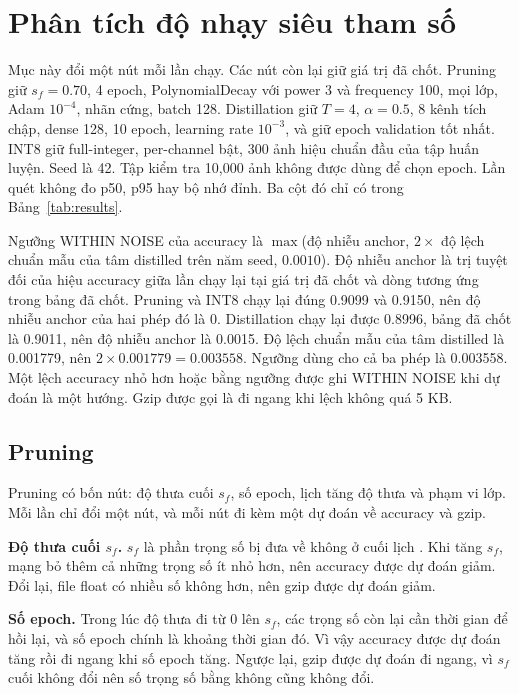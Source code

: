 \documentclass[13pt,a4paper]{article}
\begin{document}
\section{Phân tích độ nhạy siêu tham số}
\label{sec:sweep}

Mục này đổi một nút mỗi lần chạy.
Các nút còn lại giữ giá trị đã chốt.
Pruning giữ \(s_f=0.70\), 4 epoch, PolynomialDecay với power 3 và frequency 100, mọi lớp, Adam \(10^{-4}\), nhãn cứng, batch 128.
Distillation giữ \(T=4\), \(\alpha=0.5\), 8 kênh tích chập, dense 128, 10 epoch, learning rate \(10^{-3}\), và giữ epoch validation tốt nhất.
INT8 giữ full-integer, per-channel bật, 300 ảnh hiệu chuẩn đầu của tập huấn luyện.
Seed là 42.
Tập kiểm tra 10{,}000 ảnh không được dùng để chọn epoch.
Lần quét không đo p50, p95 hay bộ nhớ đỉnh.
Ba cột đó chỉ có trong Bảng~\ref{tab:results}.

Ngưỡng WITHIN NOISE của accuracy là \(\max\)(độ nhiễu anchor, \(2\times\) độ lệch chuẩn mẫu của tâm distilled trên năm seed, \(0.0010\)).
Độ nhiễu anchor là trị tuyệt đối của hiệu accuracy giữa lần chạy lại tại giá trị đã chốt và dòng tương ứng trong bảng đã chốt.
Pruning và INT8 chạy lại đúng 0.9099 và 0.9150, nên độ nhiễu anchor của hai phép đó là 0.
Distillation chạy lại được 0.8996, bảng đã chốt là 0.9011, nên độ nhiễu anchor là 0.0015.
Độ lệch chuẩn mẫu của tâm distilled là 0.001779, nên \(2\times 0.001779 = 0.003558\).
Ngưỡng dùng cho cả ba phép là 0.003558.
Một lệch accuracy nhỏ hơn hoặc bằng ngưỡng được ghi WITHIN NOISE khi dự đoán là một hướng.
Gzip được gọi là đi ngang khi lệch không quá 5 KB.

\subsection{Pruning}

Pruning có bốn nút: độ thưa cuối \(s_f\), số epoch, lịch tăng độ thưa và phạm vi lớp. Mỗi lần chỉ đổi một nút, và mỗi nút đi kèm một dự đoán về accuracy và gzip.

\textbf{Độ thưa cuối \(s_f\).} \(s_f\) là phần trọng số bị đưa về không ở cuối lịch \cite{zhu2017}. Khi tăng \(s_f\), mạng bỏ thêm cả những trọng số ít nhỏ hơn, nên accuracy được dự đoán giảm. Đổi lại, file float có nhiều số không hơn, nên gzip được dự đoán giảm.

\textbf{Số epoch.} Trong lúc độ thưa đi từ 0 lên \(s_f\), các trọng số còn lại cần thời gian để hồi lại, và số epoch chính là khoảng thời gian đó. Vì vậy accuracy được dự đoán tăng rồi đi ngang khi số epoch tăng. Ngược lại, gzip được dự đoán đi ngang, vì \(s_f\) cuối không đổi nên số trọng số bằng không cũng không đổi.
\end{document}
